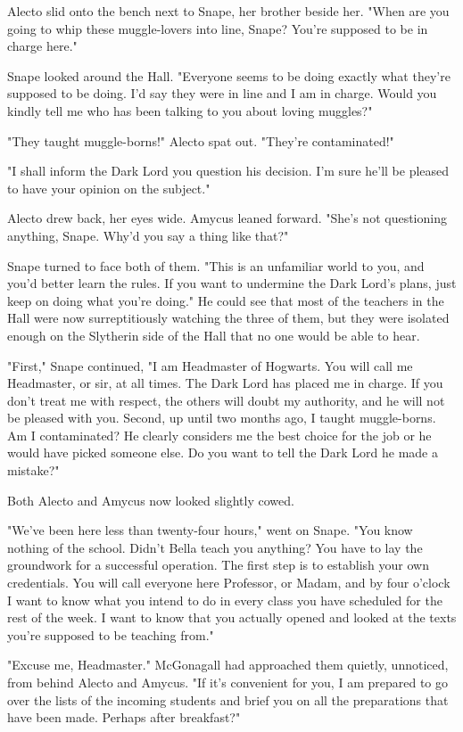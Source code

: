 \documentclass[a4paper,11pt]{article}
\begin{document}
Alecto slid onto the bench next to Snape, her brother beside her. "When are you going to whip these muggle-lovers into line, Snape? You're supposed to be in charge here."

Snape looked around the Hall. "Everyone seems to be doing exactly what they're supposed to be doing. I'd say they were in line and I am in charge. Would you kindly tell me who has been talking to you about loving muggles?"

"They taught muggle-borns!" Alecto spat out. "They're contaminated!"

"I shall inform the Dark Lord you question his decision. I'm sure he'll be pleased to have your opinion on the subject."

Alecto drew back, her eyes wide. Amycus leaned forward. "She's not questioning anything, Snape. Why'd you say a thing like that?"

Snape turned to face both of them. "This is an unfamiliar world to you, and you'd better learn the rules. If you want to undermine the Dark Lord's plans, just keep on doing what you're doing." He could see that most of the teachers in the Hall were now surreptitiously watching the three of them, but they were isolated enough on the Slytherin side of the Hall that no one would be able to hear.

"First," Snape continued, "I am Headmaster of Hogwarts. You will call me Headmaster, or sir, at all times. The Dark Lord has placed me in charge. If you don't treat me with respect, the others will doubt my authority, and he will not be pleased with you. Second, up until two months ago, I taught muggle-borns. Am I contaminated? He clearly considers me the best choice for the job or he would have picked someone else. Do you want to tell the Dark Lord he made a mistake?"

Both Alecto and Amycus now looked slightly cowed.

"We've been here less than twenty-four hours," went on Snape. "You know nothing of the school. Didn't Bella teach you anything? You have to lay the groundwork for a successful operation. The first step is to establish your own credentials. You will call everyone here Professor, or Madam, and by four o'clock I want to know what you intend to do in every class you have scheduled for the rest of the week. I want to know that you actually opened and looked at the texts you're supposed to be teaching from."

"Excuse me, Headmaster." McGonagall had approached them quietly, unnoticed, from behind Alecto and Amycus. "If it's convenient for you, I am prepared to go over the lists of the incoming students and brief you on all the preparations that have been made. Perhaps after breakfast?"
\end{document}
